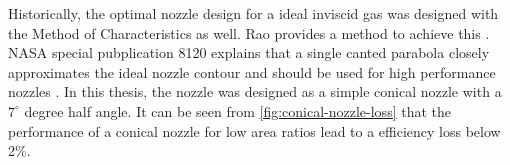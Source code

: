Historically, the optimal nozzle design for a ideal inviscid gas was designed with the Method of Characteristics as well. Rao provides a method to achieve this \cite{raoExhaustNozzleContour1958}. NASA special pubplication 8120 explains that a single canted parabola closely approximates the ideal nozzle contour and should be used for high performance nozzles \cite{LiquidRocketEngine1976}. In this thesis, the nozzle was designed as a simple conical nozzle with a $7^\circ$ degree half angle. It can be seen from \cref{fig:conical-nozzle-loss} that the performance of a conical nozzle for low area ratios lead to a efficiency loss below 2\%.







